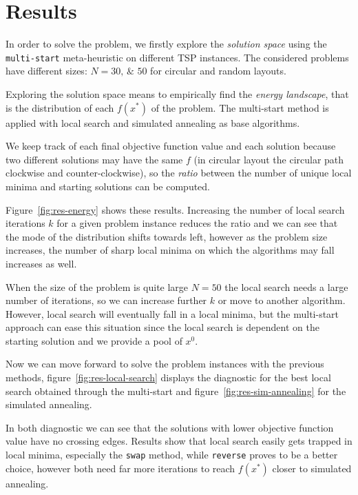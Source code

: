 \section{Results}\label{subsc:res}

In order to solve the problem, we firstly explore the \emph{solution space} using the \texttt{multi-start} meta-heuristic on different TSP instances. The considered problems have different sizes: $N=\numlist{30;50}$ for circular and random layouts.\par\medskip

Exploring the solution space means to empirically find the \emph{energy landscape}, that is the distribution of each $f(x^\ast)$ of the problem. The multi-start method is applied with local search and simulated annealing as base algorithms.

We keep track of each final objective function value and each solution because two different solutions may have the same $f$ (in circular layout the circular path clockwise and counter-clockwise), so the \emph{ratio} between the number of unique local minima and starting solutions can be computed.

Figure~\vref{fig:res-energy} shows these results. Increasing the number of local search iterations $k$ for a given problem instance reduces the ratio and we can see that the mode of the distribution shifts towards left, however as the problem size increases, the number of sharp local minima on which the algorithms may fall increases as well.

When the size of the problem is quite large $N=50$ the local search needs a large number of iterations, so we can increase further $k$ or move to another algorithm. However, local search will eventually fall in a local minima, but the multi-start approach can ease this situation since the local search is dependent on the starting solution and we provide a pool of $x^0$.\par\medskip

Now we can move forward to solve the problem instances with the previous methods, figure~\ref{fig:res-local-search} displays the diagnostic for the best local search obtained through the multi-start and figure~\vref{fig:res-sim-annealing} for the simulated annealing.

In both diagnostic we can see that the solutions with lower objective function value have no crossing edges. Results show that local search easily gets trapped in local minima, especially the \texttt{swap} method, while \texttt{reverse} proves to be a better choice, however both need far more iterations to reach $f(x^\ast)$ closer to simulated annealing.

